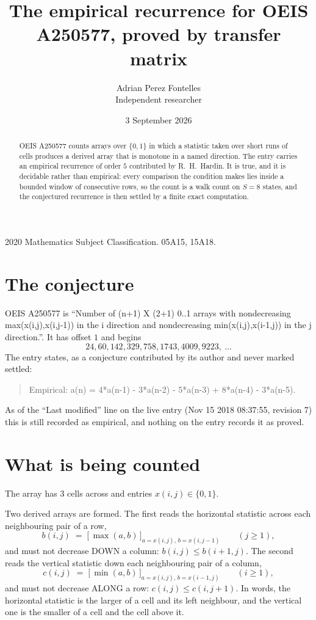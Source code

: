 \documentclass[11pt,a4paper]{article}
\title{The empirical recurrence for OEIS A250577, proved by transfer matrix}
\author{Adrian Perez Fontelles\\ \small Independent researcher}
\date{3 September 2026}
\theoremstyle{plain}
\theoremstyle{definition}
\begin{document}
\maketitle

\begin{abstract}
OEIS A250577 counts arrays over $\{0,1\}$ in which a statistic taken over short runs
of cells produces a derived array that is monotone in a named direction. The entry carries an
empirical recurrence of order $5$ contributed by R.~H.~Hardin. It is true, and it is
decidable rather than empirical: every comparison the condition makes lies inside a bounded
window of consecutive rows, so the count is a walk count on $S=8$ states, and the
conjectured recurrence is then settled by a finite exact computation.
\end{abstract}

\noindent\small 2020 Mathematics Subject Classification. 05A15, 15A18.\normalsize

\section{The conjecture}

OEIS A250577 is ``Number of (n+1) X (2+1) 0..1 arrays with nondecreasing max(x(i,j),x(i,j-1)) in the i direction and nondecreasing min(x(i,j),x(i-1,j)) in the j direction.''. It has offset $1$ and begins
\[
24, 60, 142, 329, 758, 1743, 4009, 9223,\ \dots
\]
The entry states, as a conjecture contributed by its author and never marked settled:
\begin{quote}
Empirical: a(n) = 4*a(n-1) - 3*a(n-2) - 5*a(n-3) + 8*a(n-4) - 3*a(n-5).
\end{quote}
As of the ``Last modified'' line on the live entry (Nov 15 2018 08:37:55, revision 7) this is still
recorded as empirical, and nothing on the entry records it as proved.

\section{What is being counted}

The array has $3$ cells across and entries $x(i,j)\in\{0,1\}$.

Two derived arrays are formed. The first reads the horizontal statistic across each
neighbouring pair of a row,
\[
b(i,j)\;=\;\bigl[\,\max(a,b)\,\bigr]_{a=x(i,j),\,b=x(i,j-1)}\qquad (j\ge1),
\]
and must not decrease DOWN a column: $b(i,j)\le b(i{+}1,j)$. The second reads the vertical
statistic down each neighbouring pair of a column,
\[
c(i,j)\;=\;\bigl[\,\min(a,b)\,\bigr]_{a=x(i,j),\,b=x(i{-}1,j)}\qquad (i\ge1),
\]
and must not decrease ALONG a row: $c(i,j)\le c(i,j{+}1)$. In words, the horizontal statistic
is the larger of a cell and its left neighbour, and the vertical one is
the smaller of a cell and the cell above it.
\end{document}
